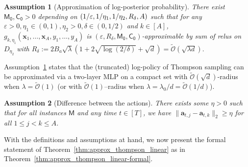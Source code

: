 \documentclass[10pt]{article}
\newtheorem{assumption}{Assumption}
\newcommand{\eps}{\varepsilon}
\newcommand{\<}{\left\langle}
\renewcommand{\>}{\right\rangle}
\newcommand{\inst}{{\mathsf{M}}}
\newcommand{\trunprob}{{\eta_1}}
\newcommand{\Trunreg}{{D}}
\newcommand{\Trunregpa}{{\eta_2}}
\newcommand{\Trunregp}{{\eta}}
\newcommand{\tcO}{{\tilde{\mathcal O}}}
\newcommand{\neuron}{{\mathsf{M_0}}}
\newcommand{\weightn}{{{\mathsf{C_0}}}}
\def\ba{{\mathbf a}}
\def\bx{{\mathbf x}}
\begin{document}
\begin{assumption}[Approximation of log-posterior probability]\label{ass:thompson_mlp_approx_linear}
 There exist  $\neuron,\weightn>0$  depending on $(1/\eps,1/\trunprob,\\1/\Trunregpa,R_\delta,A)$  such that for any $\eps>0,\trunprob\in(0,1),\Trunregpa>0,\delta\in(0,1/2)$ and $k\in[A]$, $g_{k,\trunprob}(\bx_1,\ldots,\bx_A,y_1,\ldots,y_A)$ is $(\eps,R_\delta,\neuron,\weightn)$-approximable by sum of relus on $\Trunreg_\Trunregpa$ with
$
R_\delta:=2B_a\sqrt{\lambda}(1+2\sqrt{\log(2/\delta)}+\sqrt{d})=\tcO(\sqrt{\lambda d}).
$

\end{assumption}
Assumption~\ref{ass:thompson_mlp_approx_linear} states that the (truncated) log-policy of  Thompson sampling  can be approximated via a two-layer MLP on a compact set with  $\tcO(\sqrt{d})$-radius when $\lambda=\tcO(1)$ (or with $\tcO(1)$--radius when $\lambda=\lambda_0/d=\tcO(1/d)$).  

\begin{assumption}[Difference between the actions]\label{ass:thompson_mlp_diff_action_linear}
 There exists some $\Trunregp>0$  such that for all instances $\inst$ and any time $t\in[T]$, we have $\|\ba_{t,j}-\ba_{t,k}\|_2\geq\Trunregp$ for all $1\leq j< k\leq A$.
\end{assumption}

With the definitions and assumptions at hand, we now present the formal statement of Theorem~\ref{thm:approx_thompson_linear} as in Theorem~\ref{thm:approx_thompson_linear-formal}.
\end{document}

